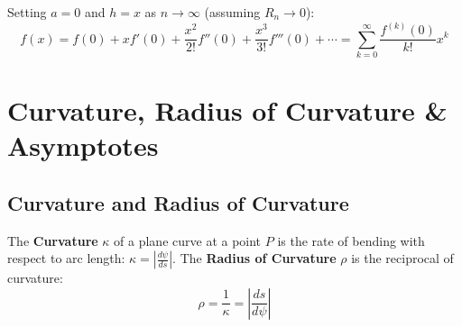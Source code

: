 \begin{theorem}
Setting $a = 0$ and $h = x$ as $n \to \infty$ (assuming $R_n \to 0$):
\begin{equation}
    f(x) = f(0) + x f'(0) + \frac{x^2}{2!} f''(0) + \frac{x^3}{3!} f'''(0) + \cdots = \sum_{k=0}^\infty \frac{f^{(k)}(0)}{k!} x^k
\end{equation}
\end{theorem}

\section{Curvature, Radius of Curvature \& Asymptotes}

\subsection{Curvature and Radius of Curvature}

\begin{definition}
The \textbf{Curvature} $\kappa$ of a plane curve at a point $P$ is the rate of bending with respect to arc length: $\kappa = \left|\frac{d\psi}{ds}\right|$. The \textbf{Radius of Curvature} $\rho$ is the reciprocal of curvature:
\begin{equation}
    \rho = \frac{1}{\kappa} = \left|\frac{ds}{d\psi}\right|
\end{equation}
\end{definition}

